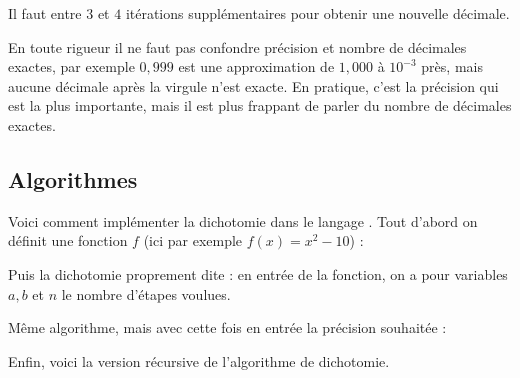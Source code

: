 \documentclass[class=report,crop=false]{standalone}
\begin{document}
Il faut entre $3$ et $4$ itérations supplémentaires pour obtenir une nouvelle décimale.

\begin{remarque*}
En toute rigueur il ne faut pas confondre précision et nombre de décimales exactes,
par exemple $0,999$ est une approximation de $1,000$ à $10^{-3}$ près, mais aucune
décimale après la virgule n'est exacte.  En pratique, c'est la précision qui est la plus importante,
mais il est plus frappant de parler du nombre de décimales exactes.
\end{remarque*}



\subsection{Algorithmes}

Voici comment implémenter la dichotomie dans le langage \Python. Tout d'abord
on définit une fonction $f$ (ici par exemple $f(x)=x^2-10$) :


Puis la dichotomie proprement dite : en entrée de la fonction, on a
pour variables $a,b$ et $n$ le nombre d'étapes voulues.


Même algorithme, mais avec cette fois en entrée la précision souhaitée :



Enfin, voici la version récursive de l'algorithme de dichotomie.



\end{document}
